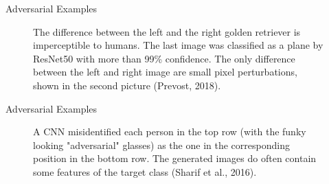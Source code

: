 \begin{frame} {Adversarial Examples}
  \begin{figure}
    \centering
       \captionsetup{font=footnotesize,labelfont=footnotesize, labelfont = bf}
      \caption{\footnotesize The difference between the left and the right golden retriever is imperceptible to humans.
      The last image was classified as a plane by ResNet50 with more than 99\% confidence. 
      The only difference between the left and right image are small pixel perturbations, shown in the second picture (Prevost, 2018).}
  \end{figure}
\end{frame}

\begin{frame} {Adversarial Examples}
  \begin{figure}
    \centering
       \captionsetup{font=footnotesize,labelfont=footnotesize, labelfont = bf}
      \caption{\footnotesize A CNN misidentified each person in the top row (with the funky looking "adversarial" glasses) as the one in the corresponding position in the bottom row. The generated images do often contain some features of the target class (Sharif et al., 2016).}
  \end{figure}
\end{frame}

